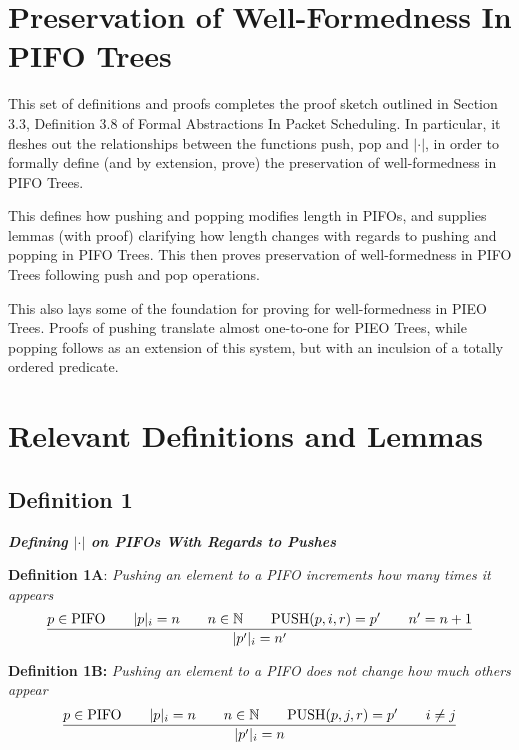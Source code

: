 \documentclass{article}
\begin{document}
\section{Preservation of Well-Formedness In PIFO Trees}

This set of definitions and proofs completes the proof sketch outlined in Section 3.3, Definition 3.8 of Formal Abstractions In Packet Scheduling. In particular, it fleshes out the relationships between the functions push, pop and $|\cdot|$, in order to formally define (and by extension, prove) the preservation of well-formedness in PIFO Trees.\newline

This defines how pushing and popping modifies length in PIFOs, and supplies lemmas (with proof) clarifying how length changes with regards to pushing and popping in PIFO Trees. This then proves preservation of well-formedness in PIFO Trees following push and pop operations.\newline

This also lays some of the foundation for proving for well-formedness in PIEO Trees. Proofs of pushing translate almost one-to-one for PIEO Trees, while popping follows as an extension of this system, but with an inculsion of a totally ordered predicate.

\section{Relevant Definitions and Lemmas}

\subsection{Definition 1}

\textbf{\textit{Defining $|\cdot|$ on PIFOs With Regards to Pushes}}

\hfill \break 

\textbf{Definition 1A}: \textit{Pushing an element to a PIFO increments how many times it appears}
 $$\frac{p \in \text{PIFO}  \hspace{0.7cm} |p|_i = n \hspace{0.7cm} n \in \mathbb{N} \hspace{0.7cm} \text{PUSH}(p, i, r) = p' \hspace{0.7cm} n' = n+1}{|p'|_i = n'}$$

\textbf{Definition 1B:} \textit{Pushing an element to a PIFO does not change how much others appear}
$$\frac{p \in \text{PIFO}  \hspace{0.7cm} |p|_i = n \hspace{0.7cm} n \in \mathbb{N} \hspace{0.7cm} \text{PUSH}(p, j, r) = p' \hspace{0.7cm} i \neq j}{|p'|_i = n}$$
\end{document}
